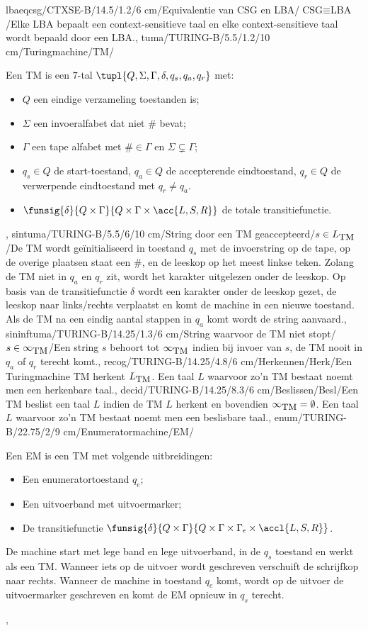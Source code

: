 lbaeqcsg/CTXSE-B/14.5/1.2/6 cm/Equivalentie van CSG en LBA/$\mbox{CSG}\equiv\mbox{LBA}$/{Elke LBA bepaalt een context-sensitieve taal en elke context-sensitieve taal wordt bepaald door een LBA.},
tuma/TURING-B/5.5/1.2/10 cm/Turingmachine/TM/{Een TM is een $7$-tal $\tupl{Q,\Sigma,\Gamma,\delta,q_s,q_a,q_r}$ met:\begin{itemize}\item $Q$ een eindige verzameling toestanden is;\item $\Sigma$ een invoeralfabet dat niet $\#$ bevat;\item $\Gamma$ een tape alfabet met $\#\in\Gamma$ en $\Sigma\subsetneq\Gamma$;\item $q_s\in Q$ de start-toestand, $q_a\in Q$ de accepterende eindtoestand, $q_r\in Q$ de verwerpende eindtoestand met $q_r\neq q_a$.\item $\funsig{\delta}{Q\times\Gamma}{Q\times\Gamma\times\acc{L,S,R}}$ de totale transitiefunctie.\end{itemize}},
sintuma/TURING-B/5.5/6/10 cm/String door een TM geaccepteerd/$s\in L_{\mbox{\small TM}}$/{De TM wordt ge\"initialiseerd in toestand $q_s$ met de invoerstring op de tape, op de overige plaatsen staat een $\#$, en de leeskop op het meest linkse teken. Zolang de TM niet in $q_a$ en $q_r$ zit, wordt het karakter uitgelezen onder de leeskop. Op basis van de transitiefunctie $\delta$ wordt een karakter onder de leeskop gezet, de leeskop naar links/rechts verplaatst en komt de machine in een nieuwe toestand. Als de TM na een eindig aantal stappen in $q_a$ komt wordt de string aanvaard.},
sininftuma/TURING-B/14.25/1.3/6 cm/String waarvoor de TM niet stopt/$s\in\infty_{\mbox{\small TM}}$/{Een string $s$ behoort tot $\infty_{\mbox{\small TM}}$ indien bij invoer van $s$, de TM nooit in $q_a$ of $q_r$ terecht komt.},
recog/TURING-B/14.25/4.8/6 cm/Herkennen/Herk/{Een Turingmachine TM herkent $L_{\mbox{\small TM}}$. Een taal $L$ waarvoor zo'n TM bestaat noemt men een herkenbare taal.},
decid/TURING-B/14.25/8.3/6 cm/Beslissen/Besl/{Een TM beslist een taal $L$ indien de TM $L$ herkent en bovendien $\infty_{\mbox{\small TM}}=\emptyset$. Een taal $L$ waarvoor zo'n TM bestaat noemt men een beslisbare taal.},
enum/TURING-B/22.75/2/9 cm/Enumeratormachine/EM/{Een EM is een TM met volgende uitbreidingen:\begin{itemize}\item Een enumeratortoestand $q_e$;\item Een uitvoerband met uitvoermarker;\item De transitiefunctie $\funsig{\delta}{Q\times\Gamma}{Q\times\Gamma\times\Gamma_{\epsilon}\times\accl{L,S,R}}$.\end{itemize}De machine start met lege band en lege uitvoerband, in de $q_s$ toestand en werkt als een TM. Wanneer iets op de uitvoer wordt geschreven verschuift de schrijfkop naar rechts. Wanneer de machine in toestand $q_e$ komt, wordt op de uitvoer de uitvoermarker geschreven en komt de EM opnieuw in $q_s$ terecht.},
